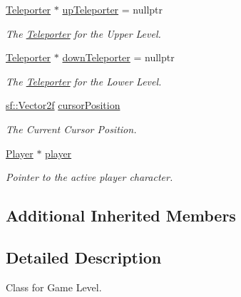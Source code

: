 \begin{DoxyCompactItemize}
\mbox{\hyperlink{class_teleporter}{Teleporter}} $\ast$ \mbox{\hyperlink{class_game_level_aaf8396a2ee0ed0fceefb0ca4324fa0dd}{up\+Teleporter}} = nullptr
\begin{DoxyCompactList}\small\item\em The \mbox{\hyperlink{class_teleporter}{Teleporter}} for the Upper Level. \end{DoxyCompactList}\item 
\mbox{\label{class_game_level_af496404bba94b3b271dc371c5742bbbd}} 
\mbox{\hyperlink{class_teleporter}{Teleporter}} $\ast$ \mbox{\hyperlink{class_game_level_af496404bba94b3b271dc371c5742bbbd}{down\+Teleporter}} = nullptr
\begin{DoxyCompactList}\small\item\em The \mbox{\hyperlink{class_teleporter}{Teleporter}} for the Lower Level. \end{DoxyCompactList}\item 
\mbox{\label{class_game_level_a16fa5a7026844de8ca21077a25833d97}} 
\mbox{\hyperlink{classsf_1_1_vector2}{sf\+::\+Vector2f}} \mbox{\hyperlink{class_game_level_a16fa5a7026844de8ca21077a25833d97}{cursor\+Position}}
\begin{DoxyCompactList}\small\item\em The Current Cursor Position. \end{DoxyCompactList}\item 
\mbox{\label{class_game_level_ae57ffa4c7577a4ff8a755e6b3eff25a1}} 
\mbox{\hyperlink{class_player}{Player}} $\ast$ \mbox{\hyperlink{class_game_level_ae57ffa4c7577a4ff8a755e6b3eff25a1}{player}}
\begin{DoxyCompactList}\small\item\em Pointer to the active player character. \end{DoxyCompactList}\end{DoxyCompactItemize}
\subsection*{Additional Inherited Members}


\subsection{Detailed Description}
Class for Game Level. 

